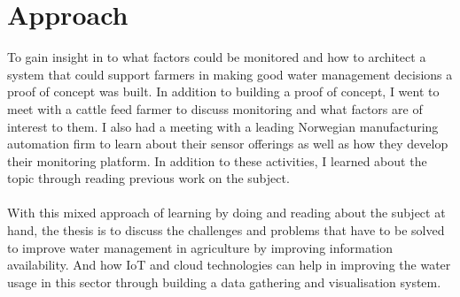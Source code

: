 \documentclass[]{uiophd}
\begin{document}
\section{Approach}
To gain insight in to what factors could be monitored and how to architect a system that could support farmers in making good water management decisions a proof of concept was built. In addition to building a proof of concept, I went to meet with a cattle feed farmer to discuss monitoring and what factors are of interest to them. I also had a meeting with a leading Norwegian manufacturing automation firm to learn about their sensor offerings as well as how they develop their monitoring platform. In addition to these activities, I learned about the topic through reading previous work on the subject.
\\\\
With this mixed approach of learning by doing and reading about the subject at hand, the thesis is to discuss the challenges and problems that have to be solved to improve water management in agriculture by improving information availability. And how IoT and cloud technologies can help in improving the water usage in this sector through building a data gathering and visualisation system.
\end{document}
